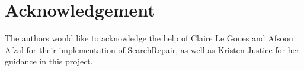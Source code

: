 \documentclass{paper}
\begin{document}
\section*{Acknowledgement}
The authors would like to acknowledge the help of Claire Le Goues and Afsoon Afzal for their implementation of SearchRepair, as well as Kristen Justice for her guidance in this project.

\addtolength{\textheight}{-12cm}   %
\end{document}
